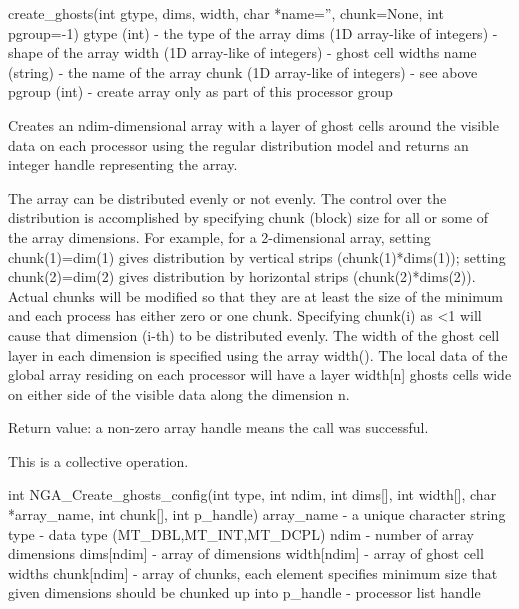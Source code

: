 \documentclass[12pt]{article}
\begin{document}
\begin{pyapi}
create_ghosts(int gtype, dims, width, char *name='', chunk=None, int pgroup=-1)
   gtype (int)                       - the type of the array
   dims (1D array-like of integers)  - shape of the array
   width (1D array-like of integers) - ghost cell widths
   name (string)                     - the name of the array
   chunk (1D array-like of integers) - see above
   pgroup (int)                      - create array only as part of this 
                                       processor group
\end{pyapi}

\begin{desc}

  Creates an ndim-dimensional array with a layer of ghost cells around
  the visible data on each processor using the regular distribution
  model and returns an integer handle representing the array.

  The array can be distributed evenly or not evenly. The control over
  the distribution is accomplished by specifying chunk (block) size
  for all or some of the array dimensions. For example, for a
  2-dimensional array, setting chunk(1)=dim(1) gives distribution by
  vertical strips (chunk(1)*dims(1)); setting chunk(2)=dim(2) gives
  distribution by horizontal strips (chunk(2)*dims(2)). Actual chunks
  will be modified so that they are at least the size of the minimum
  and each process has either zero or one chunk. Specifying chunk(i)
  as \textless 1 will cause that dimension (i-th) to be distributed evenly. The
  width of the ghost cell layer in each dimension is specified using
  the array width(). The local data of the global array residing on
  each processor will have a layer width[n] ghosts cells wide on
  either side of the visible data along the dimension n.

  Return value: a non-zero array handle means the call was successful.

  This is a collective operation.
\end{desc}



\begin{capi}
int NGA_Create_ghosts_config(int type, int ndim, int dims[], 
                             int width[], char *array_name, int chunk[], 
                             int p_handle)
   array_name             - a unique character string                     \access{[input]} 
   type                   - data type (MT_DBL,MT_INT,MT_DCPL)             \access{[input]} 
   ndim                   - number of array dimensions                    \access{[input]} 
   dims[ndim]             - array of dimensions                           \access{[input]} 
   width[ndim]            - array of ghost cell widths                    \access{[input]} 
   chunk[ndim]            - array of chunks, each element specifies
                            minimum size that given dimensions should be
                            chunked up into                               \access{[input]} 
   p_handle               - processor list handle
\end{capi}
\end{document}
